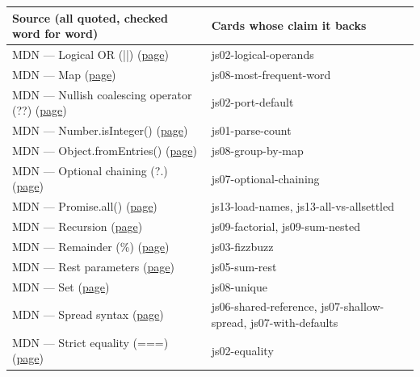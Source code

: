 \documentclass[10pt]{article}
\begin{document}
{\footnotesize\begin{tabularx}{\linewidth}{@{}p{2.2in}X@{}}\toprule
\textbf{Source (all quoted, checked word for word)} & \textbf{Cards whose claim it backs}\\\midrule
MDN — Logical OR (||) (\href{https://developer.mozilla.org/en-US/docs/Web/JavaScript/Reference/Operators/Logical_OR}{page}) & js02-logical-operands\\
MDN — Map (\href{https://developer.mozilla.org/en-US/docs/Web/JavaScript/Reference/Global_Objects/Map}{page}) & js08-most-frequent-word\\
MDN — Nullish coalescing operator (??) (\href{https://developer.mozilla.org/en-US/docs/Web/JavaScript/Reference/Operators/Nullish_coalescing}{page}) & js02-port-default\\
MDN — Number.isInteger() (\href{https://developer.mozilla.org/en-US/docs/Web/JavaScript/Reference/Global_Objects/Number/isInteger}{page}) & js01-parse-count\\
MDN — Object.fromEntries() (\href{https://developer.mozilla.org/en-US/docs/Web/JavaScript/Reference/Global_Objects/Object/fromEntries}{page}) & js08-group-by-map\\
MDN — Optional chaining (?.) (\href{https://developer.mozilla.org/en-US/docs/Web/JavaScript/Reference/Operators/Optional_chaining}{page}) & js07-optional-chaining\\
MDN — Promise.all() (\href{https://developer.mozilla.org/en-US/docs/Web/JavaScript/Reference/Global_Objects/Promise/all}{page}) & js13-load-names, js13-all-vs-allsettled\\
MDN — Recursion (\href{https://developer.mozilla.org/en-US/docs/Glossary/Recursion}{page}) & js09-factorial, js09-sum-nested\\
MDN — Remainder (\%) (\href{https://developer.mozilla.org/en-US/docs/Web/JavaScript/Reference/Operators/Remainder}{page}) & js03-fizzbuzz\\
MDN — Rest parameters (\href{https://developer.mozilla.org/en-US/docs/Web/JavaScript/Reference/Functions/rest_parameters}{page}) & js05-sum-rest\\
MDN — Set (\href{https://developer.mozilla.org/en-US/docs/Web/JavaScript/Reference/Global_Objects/Set}{page}) & js08-unique\\
MDN — Spread syntax (\href{https://developer.mozilla.org/en-US/docs/Web/JavaScript/Reference/Operators/Spread_syntax}{page}) & js06-shared-reference, js07-shallow-spread, js07-with-defaults\\
MDN — Strict equality (===) (\href{https://developer.mozilla.org/en-US/docs/Web/JavaScript/Reference/Operators/Strict_equality}{page}) & js02-equality\\

\end{tabularx}}
\end{document}
